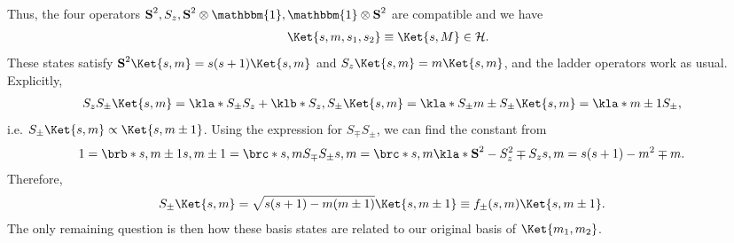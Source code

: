 \documentclass[english, parskip=full]{scrartcl}
\begin{document}
Thus, the four operators $\textbf{S}^2,S_z,\textbf{S}^2\otimes \mathbbm{1}, \mathbbm{1} \otimes \textbf{S}^2$ are compatible and we have
\begin{align}
\Ket{s,m,s_1,s_2} \equiv \Ket{s,M} \in \mathcal{H}.
\end{align}
These states satisfy $\textbf{S}^2 \Ket{s,m} = s(s+1) \Ket{s,m}$ and $S_z\Ket{s,m} = m\Ket{s,m}$, and the ladder operators work as usual.
Explicitly,
\begin{align}
S_zS_\pm\Ket{s,m} &= \kla*{S_\pm S_z + \klb*{S_z,S_\pm}} \Ket{s,m} = \kla*{S_\pm m \pm S_\pm} \Ket{s,m} = \kla*{m\pm 1} S_\pm,
\end{align}
i.e. $S_\pm \Ket{s,m} \propto \Ket{s,m\pm 1}$.
Using the expression for $S_\mp S_\pm$, we can find the constant from
\begin{align}
1 &= \brb*{s,m\pm 1}{s,m\pm 1} = \brc*{s,m}{S_\mp S_\pm}{s,m} = \brc*{s,m}{ \kla*{\textbf{S}^2 - S_z^2 \mp S_z}}{s,m} = s(s+1)-m^2\mp m.
\end{align}
Therefore,
\begin{align}
S_\pm\Ket{s,m} &= \sqrt{s(s+1) - m(m\pm 1)} \Ket{s,m\pm 1} \equiv f_\pm(s,m) \Ket{s,m\pm 1}.
\end{align}
The only remaining question is then how these basis states are related to our original basis of $\Ket{m_1,m_2}$.
\end{document}
